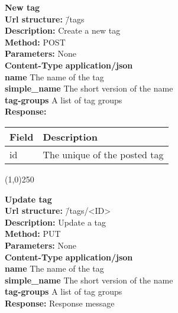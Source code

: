 \documentclass[11pt]{article}
\begin{document}
\begin{tabbing}
\textbf{New tag} \\
\textcolor{black!60}{\textbf{Url structure:}} \hspace{0.2in} \= /tags \\
\textcolor{black!60}{\textbf{Description:}}  \> Create a new tag \\
\textcolor{black!60}{\textbf{Method:}} \> POST \\
\textcolor{black!60}{\textbf{Parameters:}} \> None \\
\textcolor{black!60}{\textbf{Content-Type}} \> \textbf{application/json} \\
\> \textbf{name} The name of the tag \\
\> \textbf{simple\_name} The short version of the name \\
\> \textbf{tag-groups} A list of tag groups \\
\textcolor{black!60}{\textbf{Response:}} \\ \>
\begin{tabular}{|l|l|}
\hline
 Field  &  Description                   \\
\hline
 id     &  The unique of the posted tag  \\
\hline
\end{tabular}
\end{tabbing}

\begin{center}\line(1,0){250}\end{center}

\begin{tabbing}
\textbf{Update tag} \\
\textcolor{black!60}{\textbf{Url structure:}} \hspace{0.2in} \= /tags/<ID> \\
\textcolor{black!60}{\textbf{Description:}}  \> Update a tag \\
\textcolor{black!60}{\textbf{Method:}} \> PUT \\
\textcolor{black!60}{\textbf{Parameters:}} \> None \\
\textcolor{black!60}{\textbf{Content-Type}} \> \textbf{application/json} \\
\> \textbf{name} The name of the tag \\
\> \textbf{simple\_name} The short version of the name \\
\> \textbf{tag-groups} A list of tag groups \\
\textcolor{black!60}{\textbf{Response:}} \> Response message
\end{tabbing}
\end{document}
